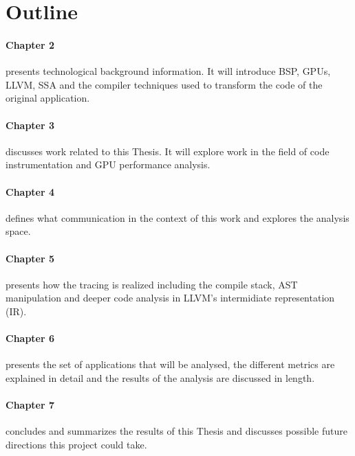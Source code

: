 \section{Outline}
	\paragraph{Chapter 2} presents technological background information. It will introduce BSP, GPUs, LLVM, SSA and the compiler techniques used to transform the code of the original application.
	\paragraph{Chapter 3} discusses work related to this Thesis. It will explore work in the field of code instrumentation and GPU performance analysis.
	\paragraph{Chapter 4} defines what communication in the context of this work and explores the analysis space.
	\paragraph{Chapter 5} presents how the tracing is realized including the compile stack, AST manipulation and deeper code analysis in LLVM's intermidiate representation (IR).
	\paragraph{Chapter 6} presents the set of applications that will be analysed, the different metrics are explained in detail and the results of the analysis are discussed in length.
	\paragraph{Chapter 7} concludes and summarizes the results of this Thesis and discusses possible future directions this project could take.
